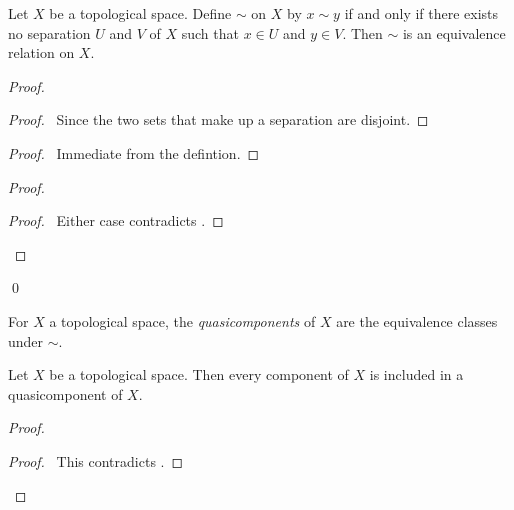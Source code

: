 \begin{proposition}
    Let $X$ be a topological space. Define $\sim$ on $X$ by $x \sim y$ if and only if there exists no
    separation $U$ and $V$ of $X$ such that $x \in U$ and $y \in V$. Then $\sim$ is an equivalence relation on $X$.
\end{proposition}

\begin{proof}
    \pf
    \begin{proof}
        \pf\ Since the two sets that make up a separation are disjoint.
    \end{proof}
    \begin{proof}
        \pf\ Immediate from the defintion.
    \end{proof}
    \begin{proof}
        \qedstep
        \begin{proof}
            \pf\ Either case contradicts .
        \end{proof}
    \end{proof}
    \qed
\end{proof}

\begin{definition}[Quasicomponents]
    For $X$ a topological space, the \emph{quasicomponents} of $X$ are the
    equivalence classes under $\sim$.
\end{definition}

\begin{proposition}
    Let $X$ be a topological space. Then every component of $X$ is included in a quasicomponent of $X$.
\end{proposition}

\begin{proof}
    \pf
    \qedstep
    \begin{proof}
        \pf\ This contradicts .
    \end{proof}
\end{proof}

